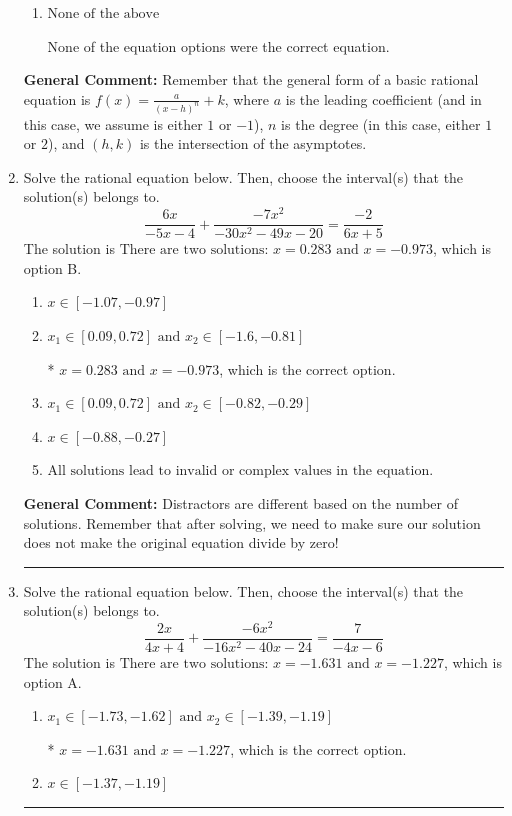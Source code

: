 \documentclass{extbook}[14pt]
\newcommand{\litem}[1]{\item #1

\rule{\textwidth}{0.4pt}}
\begin{document}
\begin{enumerate}
{\begin{enumerate}[label=\Alph*.]
The $x$- and $y$-value of the equation does not match the graph.
\item \( \text{None of the above} \)

None of the equation options were the correct equation.
\end{enumerate}

\textbf{General Comment:} Remember that the general form of a basic rational equation is $ f(x) = \frac{a}{(x-h)^n} + k$, where $a$ is the leading coefficient (and in this case, we assume is either $1$ or $-1$), $n$ is the degree (in this case, either $1$ or $2$), and $(h, k)$ is the intersection of the asymptotes.
}
\litem{
Solve the rational equation below. Then, choose the interval(s) that the solution(s) belongs to.
\[ \frac{6x}{-5x -4} + \frac{-7x^{2}}{-30x^{2} -49 x -20} = \frac{-2}{6x + 5} \]The solution is \( \text{There are two solutions: } x = 0.283 \text{ and } x = -0.973 \), which is option B.\begin{enumerate}[label=\Alph*.]
\item \( x \in [-1.07,-0.97] \)


\item \( x_1 \in [0.09, 0.72] \text{ and } x_2 \in [-1.6,-0.81] \)

* $x = 0.283 \text{ and } x = -0.973$, which is the correct option.
\item \( x_1 \in [0.09, 0.72] \text{ and } x_2 \in [-0.82,-0.29] \)


\item \( x \in [-0.88,-0.27] \)


\item \( \text{All solutions lead to invalid or complex values in the equation.} \)


\end{enumerate}

\textbf{General Comment:} Distractors are different based on the number of solutions. Remember that after solving, we need to make sure our solution does not make the original equation divide by zero!
}
\litem{
Solve the rational equation below. Then, choose the interval(s) that the solution(s) belongs to.
\[ \frac{2x}{4x + 4} + \frac{-6x^{2}}{-16x^{2} -40 x -24} = \frac{7}{-4x -6} \]The solution is \( \text{There are two solutions: } x = -1.631 \text{ and } x = -1.227 \), which is option A.\begin{enumerate}[label=\Alph*.]
\item \( x_1 \in [-1.73, -1.62] \text{ and } x_2 \in [-1.39,-1.19] \)

* $x = -1.631 \text{ and } x = -1.227$, which is the correct option.
\item \( x \in [-1.37,-1.19] \)



\end{enumerate}}
\end{enumerate}
\end{document}
